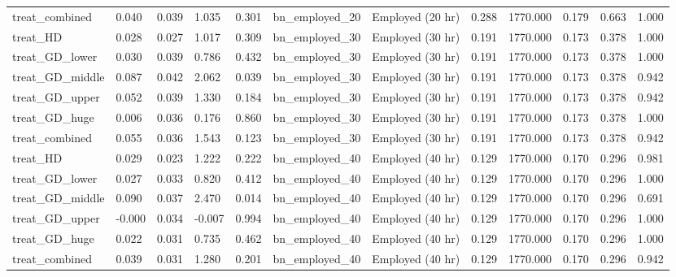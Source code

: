 \begin{tabular}{llllllllllll}
treat\_combined & 0.040 & 0.039 & 1.035 & 0.301 & bn\_employed\_20 & Employed (20 hr) & 0.288 & 1770.000 & 0.179 & 0.663 & 1.000 \\
treat\_HD & 0.028 & 0.027 & 1.017 & 0.309 & bn\_employed\_30 & Employed (30 hr) & 0.191 & 1770.000 & 0.173 & 0.378 & 1.000 \\
treat\_GD\_lower & 0.030 & 0.039 & 0.786 & 0.432 & bn\_employed\_30 & Employed (30 hr) & 0.191 & 1770.000 & 0.173 & 0.378 & 1.000 \\
treat\_GD\_middle & 0.087 & 0.042 & 2.062 & 0.039 & bn\_employed\_30 & Employed (30 hr) & 0.191 & 1770.000 & 0.173 & 0.378 & 0.942 \\
treat\_GD\_upper & 0.052 & 0.039 & 1.330 & 0.184 & bn\_employed\_30 & Employed (30 hr) & 0.191 & 1770.000 & 0.173 & 0.378 & 0.942 \\
treat\_GD\_huge & 0.006 & 0.036 & 0.176 & 0.860 & bn\_employed\_30 & Employed (30 hr) & 0.191 & 1770.000 & 0.173 & 0.378 & 1.000 \\
treat\_combined & 0.055 & 0.036 & 1.543 & 0.123 & bn\_employed\_30 & Employed (30 hr) & 0.191 & 1770.000 & 0.173 & 0.378 & 0.942 \\
treat\_HD & 0.029 & 0.023 & 1.222 & 0.222 & bn\_employed\_40 & Employed (40 hr) & 0.129 & 1770.000 & 0.170 & 0.296 & 0.981 \\
treat\_GD\_lower & 0.027 & 0.033 & 0.820 & 0.412 & bn\_employed\_40 & Employed (40 hr) & 0.129 & 1770.000 & 0.170 & 0.296 & 1.000 \\
treat\_GD\_middle & 0.090 & 0.037 & 2.470 & 0.014 & bn\_employed\_40 & Employed (40 hr) & 0.129 & 1770.000 & 0.170 & 0.296 & 0.691 \\
treat\_GD\_upper & -0.000 & 0.034 & -0.007 & 0.994 & bn\_employed\_40 & Employed (40 hr) & 0.129 & 1770.000 & 0.170 & 0.296 & 1.000 \\
treat\_GD\_huge & 0.022 & 0.031 & 0.735 & 0.462 & bn\_employed\_40 & Employed (40 hr) & 0.129 & 1770.000 & 0.170 & 0.296 & 1.000 \\
treat\_combined & 0.039 & 0.031 & 1.280 & 0.201 & bn\_employed\_40 & Employed (40 hr) & 0.129 & 1770.000 & 0.170 & 0.296 & 0.942 \\
\bottomrule
\end{tabular}
